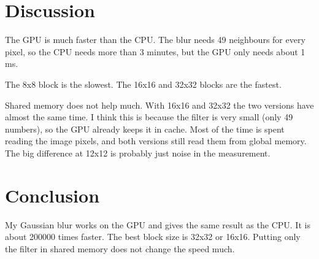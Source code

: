\documentclass[11pt,a4paper]{article}
\begin{document}
\section{Discussion}
The GPU is much faster than the CPU. The blur needs 49 neighbours for
every pixel, so the CPU needs more than 3 minutes, but the GPU only
needs about 1 ms.

The 8x8 block is the slowest. The 16x16 and 32x32 blocks are the
fastest.

Shared memory does not help much. With 16x16 and 32x32 the two
versions have almost the same time. I think this is because the filter
is very small (only 49 numbers), so the GPU already keeps it in cache.
Most of the time is spent reading the image pixels, and both versions
still read them from global memory. The big difference at 12x12 is
probably just noise in the measurement.

\section{Conclusion}
My Gaussian blur works on the GPU and gives the same result as the CPU.
It is about 200000 times faster. The best block size is 32x32 or
16x16. Putting only the filter in shared memory does not change the
speed much.
\end{document}
